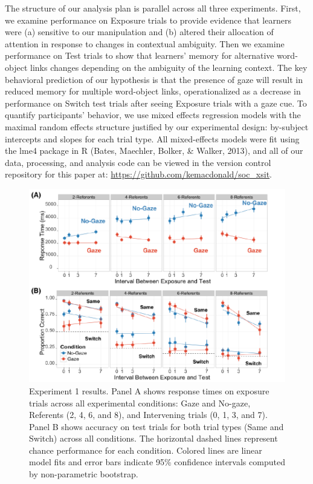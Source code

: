 \documentclass[a4paper,man,floatsintext]{apa6}
\newenvironment{CodeChunk}{}{}
\begin{document}
The structure of our analysis plan is parallel across all three
experiments. First, we examine performance on Exposure trials to provide
evidence that learners were (a) sensitive to our manipulation and (b)
altered their allocation of attention in response to changes in
contextual ambiguity. Then we examine performance on Test trials to show
that learners' memory for alternative word-object links changes
depending on the ambiguity of the learning context. The key behavioral
prediction of our hypothesis is that the presence of gaze will result in
reduced memory for multiple word-object links, operationalized as a
decrease in performance on Switch test trials after seeing Exposure
trials with a gaze cue. To quantify participants' behavior, we use mixed
effects regression models with the maximal random effects structure
justified by our experimental design: by-subject intercepts and slopes
for each trial type. All mixed-effects models were fit using the lme4
package in R (Bates, Maechler, Bolker, \& Walker, 2013), and all of our
data, processing, and analysis code can be viewed in the version control
repository for this paper at:
\url{https://github.com/kemacdonald/soc_xsit}.

\begin{CodeChunk}
\begin{figure}[!ht]
\includegraphics{figs/expt1-plot-1} \caption[Experiment 1 results]{Experiment 1 results. Panel A shows response times on exposure trials across all experimental conditions: Gaze and No-gaze, Referents (2, 4, 6, and 8), and Intervening trials (0, 1, 3, and 7). Panel B shows accuracy on test trials for both trial types (Same and Switch) across all conditions. The horizontal dashed lines represent chance performance for each condition. Colored lines are linear model fits and error bars indicate 95\% confidence intervals computed by non-parametric bootstrap.}\label{fig:expt1-plot}
\end{figure}
\end{CodeChunk}
\end{document}

